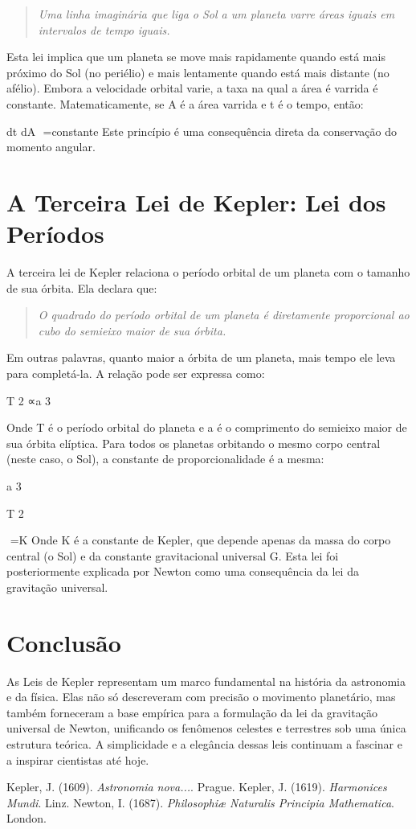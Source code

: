 \documentclass{article}
\begin{document}
\begin{quote}
\textit{Uma linha imaginária que liga o Sol a um planeta varre áreas iguais em intervalos de tempo iguais.}
\end{quote}

Esta lei implica que um planeta se move mais rapidamente quando está mais próximo do Sol (no periélio) e mais lentamente quando está mais distante (no afélio). Embora a velocidade orbital varie, a taxa na qual a área é varrida é constante. Matematicamente, se A é a área varrida e t é o tempo, então:

dt
dA
​
 =constante
Este princípio é uma consequência direta da conservação do momento angular.

\section{A Terceira Lei de Kepler: Lei dos Períodos}
A terceira lei de Kepler relaciona o período orbital de um planeta com o tamanho de sua órbita. Ela declara que:

\begin{quote}
\textit{O quadrado do período orbital de um planeta é diretamente proporcional ao cubo do semieixo maior de sua órbita.}
\end{quote}

Em outras palavras, quanto maior a órbita de um planeta, mais tempo ele leva para completá-la. A relação pode ser expressa como:

T 
2
 ∝a 
3
 
Onde T é o período orbital do planeta e a é o comprimento do semieixo maior de sua órbita elíptica. Para todos os planetas orbitando o mesmo corpo central (neste caso, o Sol), a constante de proporcionalidade é a mesma:

a 
3
 
T 
2
 
​
 =K
Onde K é a constante de Kepler, que depende apenas da massa do corpo central (o Sol) e da constante gravitacional universal G. Esta lei foi posteriormente explicada por Newton como uma consequência da lei da gravitação universal.

\section{Conclusão}
As Leis de Kepler representam um marco fundamental na história da astronomia e da física. Elas não só descreveram com precisão o movimento planetário, mas também forneceram a base empírica para a formulação da lei da gravitação universal de Newton, unificando os fenômenos celestes e terrestres sob uma única estrutura teórica. A simplicidade e a elegância dessas leis continuam a fascinar e a inspirar cientistas até hoje.

\begin{thebibliography}{9}
 Kepler, J. (1609). \textit{Astronomia nova...}. Prague.
 Kepler, J. (1619). \textit{Harmonices Mundi}. Linz.
 Newton, I. (1687). \textit{Philosophiæ Naturalis Principia Mathematica}. London.
\end{thebibliography}
\end{document}
